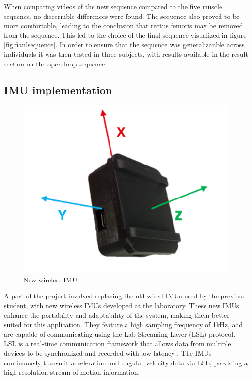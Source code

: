 When comparing videos of the new sequence compared to the five muscle sequence, no discernible differences were found. The sequence also proved to be more comfortable, leading to the conclusion that rectus femoris may be removed from the sequence. This led to the choice of the final sequence visualized in figure \ref{fig:fianlsequence}. In order to ensure that the sequence was generalizanble across individuals it was then tested in three subjects, with results available in the result section on the open-loop sequence.


\subsection{IMU implementation}
\begin{figure}
        \centering
    \includegraphics[width=\linewidth]{images/IMU_directions.png}
    \caption{New wireless IMU}
    \label{fig:imudirection}
\end{figure}
A part of the project involved replacing the old wired IMUs used by the previous student, with new wireless IMUs developed at the laboratory. These new IMUs enhance the portability and adaptability of the system, making them better suited for this application. They feature a high sampling frequency of 1kHz, and are capable of communicating using the Lab Streaming Layer (LSL) protocol. LSL is a real-time communication framework that allows data from multiple devices to be synchronized and recorded with low latency \cite{noauthor_lsl-website_nodate}. The IMUs continuously transmit acceleration and angular velocity data via LSL, providing a high-resolution stream of motion information.

